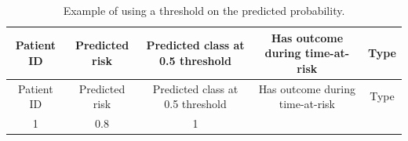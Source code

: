 \documentclass[10.5pt]{book}
\theoremstyle{definition}
\theoremstyle{definition}
\theoremstyle{definition}
\theoremstyle{remark}
\begin{document}
\begin{longtable}[]{@{}ccccc@{}}
\caption{\label{tab:tabletheorytab} Example of using a threshold on the
predicted probability.}\tabularnewline
\toprule
\begin{minipage}[b]{0.12\columnwidth}\centering\strut
Patient ID\strut
\end{minipage} & \begin{minipage}[b]{0.14\columnwidth}\centering\strut
Predicted risk\strut
\end{minipage} & \begin{minipage}[b]{0.14\columnwidth}\centering\strut
Predicted class at 0.5 threshold\strut
\end{minipage} & \begin{minipage}[b]{0.14\columnwidth}\centering\strut
Has outcome during time-at-risk\strut
\end{minipage} & \begin{minipage}[b]{0.11\columnwidth}\centering\strut
Type\strut
\end{minipage}\tabularnewline
\midrule
\endfirsthead
\toprule
\begin{minipage}[b]{0.12\columnwidth}\centering\strut
Patient ID\strut
\end{minipage} & \begin{minipage}[b]{0.14\columnwidth}\centering\strut
Predicted risk\strut
\end{minipage} & \begin{minipage}[b]{0.14\columnwidth}\centering\strut
Predicted class at 0.5 threshold\strut
\end{minipage} & \begin{minipage}[b]{0.14\columnwidth}\centering\strut
Has outcome during time-at-risk\strut
\end{minipage} & \begin{minipage}[b]{0.11\columnwidth}\centering\strut
Type\strut
\end{minipage}\tabularnewline
\midrule
\endhead
\begin{minipage}[t]{0.12\columnwidth}\centering\strut
1\strut
\end{minipage} & \begin{minipage}[t]{0.14\columnwidth}\centering\strut
0.8\strut
\end{minipage} & \begin{minipage}[t]{0.14\columnwidth}\centering\strut
1\strut
\end{minipage} & \begin{minipage}[t]{0.14\columnwidth}\centering\strut

\end{minipage}
\end{longtable}
\end{document}
